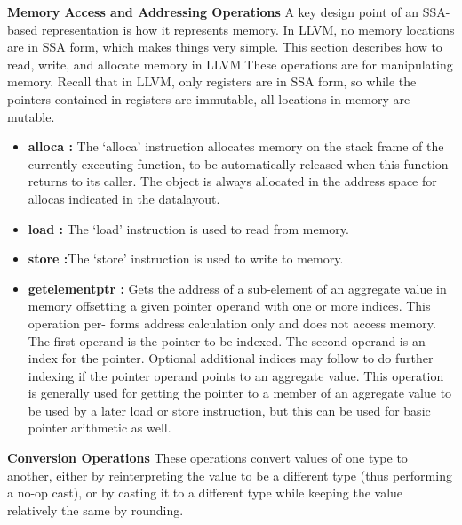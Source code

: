 \documentclass{book}
\begin{document}
	\textbf{Memory Access and Addressing Operations} \newline \newline
	A key design point of an SSA-based representation is how it represents memory. In LLVM, no memory locations are in SSA form, which makes things very simple. This section describes how to read, write, and allocate memory in LLVM.These operations are for manipulating memory.  Recall that in LLVM, only registers are
	in SSA form, so while the pointers contained in registers are immutable, all locations in	memory are mutable.
	
	\begin{itemize}
		\item \textbf{alloca : }The `alloca' instruction allocates memory on the stack frame of the currently executing function, to be automatically released when this function returns to its caller. The object is always allocated in the address space for allocas indicated in the datalayout.
		\item \textbf{load : }The `load' instruction is used to read from memory.
		\item \textbf{store :}The `store' instruction is used to write to memory.
		\item \textbf{getelementptr : }Gets the address of a sub-element of an aggregate value in memory offsetting a given pointer operand with one or more indices. This operation per-
		forms address calculation only and does not access memory. The first operand is the pointer to be indexed.  The second operand is an index for the pointer.  Optional additional indices may follow to do further indexing if the pointer operand points to an aggregate value. This operation is generally used for getting the pointer to a member	of an aggregate value to be used by a later load or store instruction, but this can be
		used for basic pointer arithmetic as well.
	\end{itemize}

	\textbf{Conversion Operations} \newline \newline
	These operations convert values of one type to another, either by reinterpreting the value to	be a different type (thus performing a no-op cast), or by casting it to a different type while
	keeping the value relatively the same by rounding.
	
\end{document}
